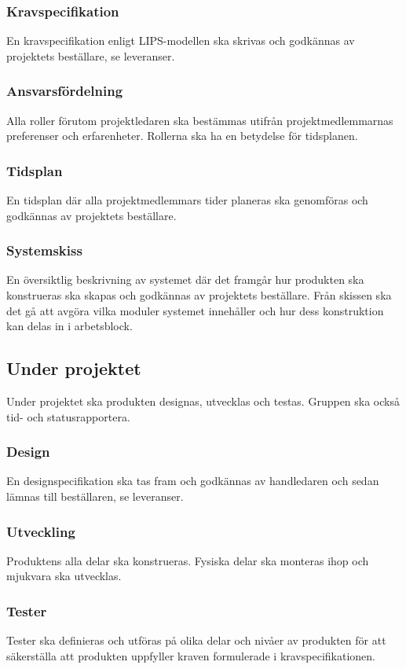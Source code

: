 \documentclass{article}
\begin{document}
\subsubsection{Kravspecifikation}
En kravspecifikation enligt LIPS-modellen ska skrivas och godkännas av projektets beställare, se leveranser.

\subsubsection{Ansvarsfördelning}
Alla roller förutom projektledaren ska bestämmas utifrån projektmedlemmarnas preferenser och erfarenheter. Rollerna ska ha en betydelse för tidsplanen.

\subsubsection{Tidsplan}
En tidsplan där alla projektmedlemmars tider planeras ska genomföras och godkännas av projektets beställare.

\subsubsection{Systemskiss}
En översiktlig beskrivning av systemet där det framgår hur produkten ska konstrueras ska skapas och godkännas av projektets beställare. Från skissen ska det gå att avgöra vilka moduler systemet innehåller och hur dess konstruktion kan delas in i arbetsblock.

\subsection{Under projektet}
Under projektet ska produkten designas, utvecklas och testas. Gruppen ska också tid- och statusrapportera.

\subsubsection{Design}
En designspecifikation ska tas fram och godkännas av handledaren och sedan lämnas till beställaren, se leveranser.

\subsubsection{Utveckling}
Produktens alla delar ska konstrueras. Fysiska delar ska monteras ihop och mjukvara ska utvecklas.

\subsubsection{Tester}
Tester ska definieras och utföras på olika delar och nivåer av produkten för att säkerställa att produkten uppfyller kraven formulerade i kravspecifikationen.
\end{document}
